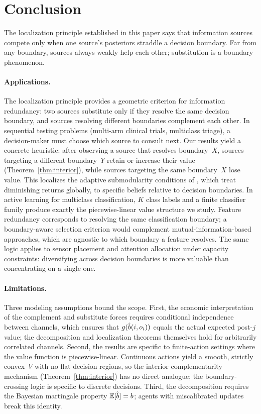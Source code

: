 \section{Conclusion}
\label{sec:discussion}

The localization principle established in this paper says that information sources compete only when one source's posteriors straddle a decision boundary.
Far from any boundary, sources always weakly help each other; substitution is a boundary phenomenon.

\paragraph{Applications.}
The localization principle provides a geometric criterion for information redundancy: two sources substitute only if they resolve the same decision boundary, and sources resolving different boundaries complement each other.
In sequential testing problems (multi-arm clinical trials, multiclass triage), a decision-maker must choose which source to consult next.
Our results yield a concrete heuristic: after observing a source that resolves boundary~$X$, sources targeting a different boundary~$Y$ retain or increase their value (Theorem~\ref{thm:interior}), while sources targeting the same boundary~$X$ lose value.
This localizes the adaptive submodularity conditions of \citet{GolovinKrause2011}, which treat diminishing returns globally, to specific beliefs relative to decision boundaries.
In active learning for multiclass classification, $K$ class labels and a finite classifier family produce exactly the piecewise-linear value structure we study.
Feature redundancy corresponds to resolving the same classification boundary; a boundary-aware selection criterion would complement mutual-information-based approaches, which are agnostic to which boundary a feature resolves.
The same logic applies to sensor placement and attention allocation under capacity constraints: diversifying across decision boundaries is more valuable than concentrating on a single one.

\paragraph{Limitations.}
Three modeling assumptions bound the scope.
First, the economic interpretation of the complement and substitute forces requires conditional independence between channels, which ensures that $g(\hat{b}(i, o_i))$ equals the actual expected post-$j$ value; the decomposition and localization theorems themselves hold for arbitrarily correlated channels.
Second, the results are specific to finite-action settings where the value function is piecewise-linear.
Continuous actions yield a smooth, strictly convex~$V$ with no flat decision regions, so the interior complementarity mechanism (Theorem~\ref{thm:interior}) has no direct analogue; the boundary-crossing logic is specific to discrete decisions.
Third, the decomposition requires the Bayesian martingale property $\mathbb{E}[\hat{b}] = b$; agents with miscalibrated updates break this identity.

